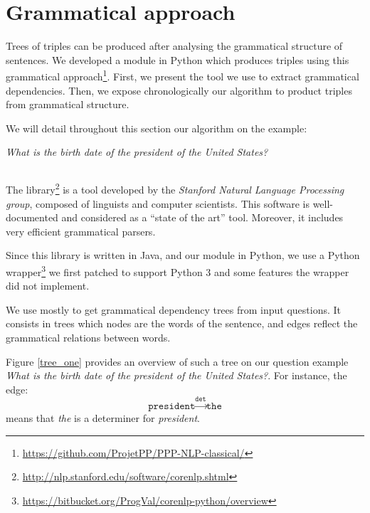 \section{Grammatical approach}

Trees of triples can be produced after analysing the grammatical structure of sentences.
We developed a module in Python which produces triples using this grammatical approach\footnote{\url{https://github.com/ProjetPP/PPP-NLP-classical/}}.
First, we  present the tool we use to extract grammatical dependencies. Then, we expose chronologically our algorithm to product triples from grammatical structure.

We will detail throughout this section our algorithm on the example:
\begin{center}
 \textit{What is the birth date of the president of the United States?}
\end{center}


\subsection{\Stanford}

The \Stanford library\footnote{\url{http://nlp.stanford.edu/software/corenlp.shtml}} is a tool developed by the \emph{Stanford Natural Language Processing group}, composed of linguists and computer scientists. This software is well-documented and considered as a ``state of the art'' tool. Moreover, it includes very efficient grammatical parsers.

Since this library is written in Java, and our module in Python, we use a Python wrapper\footnote{\url{https://bitbucket.org/ProgVal/corenlp-python/overview}} we first patched to support Python 3 and some features the wrapper did not implement.

We use \CoreNLP mostly to get grammatical dependency trees from input questions. It consists in trees which nodes are the words of the sentence, and edges reflect the grammatical relations between words.

Figure \ref{tree_one} provides an overview of such a tree on our question example \emph{What is the birth date of the president of the United States?}. For instance, the edge:
  \[\texttt{president}\xrightarrow{\texttt{det}}\texttt{the}\]
means that \emph{the} is a determiner for \emph{president}.

